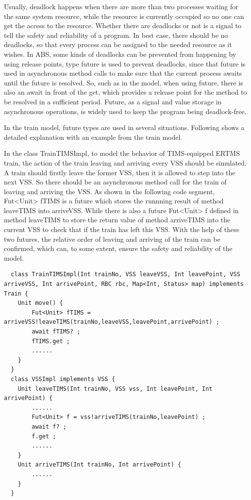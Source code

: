\documentclass[article,dr=phil,type=msc,colorback,accentcolor=tud9c]{tudthesis}
\begin{document}
  Usually, deadlock happens when there are more than two processes waiting for the same system resource, while the resource is currently occupied so no one can get the access to the resource. Whether there are deadlocks or not is a signal to tell the safety and reliability of a program. In best case, there should be no deadlocks, so that every process can be assigned to the needed resource as it wishes. In ABS, some kinds of deadlocks can be prevented from happening by using release points, type future is used to prevent deadlocks, since that future is used in asynchronous method calls to make sure that the current process awaits until the future is resolved. So, such as in the model, when using future, there is also an await in front of the get, which provides a release point for the method to be resolved in a sufficient period. Future, as a signal and value storage in asynchronous operations, is widely used to keep the program being deadlock-free. \cite{pachl2011deadlock}
  
  In the train model, future types are used in several situations. Following shows a detailed explanation with an example from the train model.

  In the class TrainTIMSImpl, to model the behavior of TIMS-equipped ERTMS train, the action of the train leaving and arriving every VSS should be simulated. A train should firstly leave the former VSS, then it is allowed to step into the next VSS. So there should be an asynchronous method call for the train of leaving and arriving the VSS. As shown in the following code segment, Fut<Unit> fTIMS is a future which stores the runnning result of method leaveTIMS into arriveVSS. While there is also a future Fut<Unit> f defined in method leaveTIMS to store the return value of method arriveTIMS into the current VSS to check that if the train has left this VSS. With the help of these two futures, the relative order of leaving and arriving of the train can be confirmed, which can, to some extent, ensure the safety and reliability of the model.

	\begin{lstlisting}  
  class TrainTIMSImpl(Int trainNo, VSS leaveVSS, Int leavePoint, VSS arriveVSS, Int arrivePoint, RBC rbc, Map<Int, Status> map) implements Train {
  	Unit move() {
  		Fut<Unit> fTIMS = arriveVSS!leaveTIMS(trainNo,leaveVSS,leavePoint,arrivePoint) ;
  		await fTIMS? ;
  		fTIMS.get ;
		......
  	}
  } 
  class VSSImpl implements VSS {
  	Unit leaveTIMS(Int trainNo, VSS vss, Int leavePoint, Int arrivePoint) {
  		......
  		Fut<Unit> f = vss!arriveTIMS(trainNo,leavePoint) ;
  		await f? ;
  		f.get ;
		......
  	}
    Unit arriveTIMS(Int trainNo, Int arrivePoint) {
  		......
  	}
  }  \end{lstlisting}
  
\end{document}

